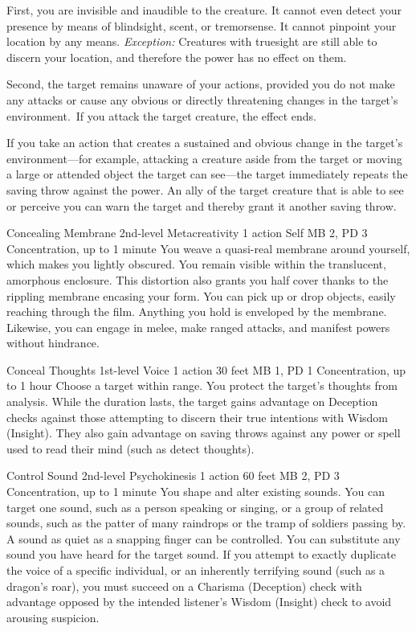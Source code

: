 First, you are invisible and inaudible to the creature.
It cannot even detect your presence by means of blindsight,
scent, or tremorsense.
It cannot pinpoint your location by any means.
\textit{Exception:} Creatures with truesight are still
able to discern your location,
and therefore the power has no effect on them.
  
Second, the target remains unaware of your actions,
provided you do not make any attacks or cause any obvious
or directly threatening changes in the target's environment.\
If you attack the target creature, the effect ends.
  
If you take an action that creates a sustained and obvious change
in the target's environment---for example, attacking a creature
aside from the target or moving a large or attended object
the target can see---the target immediately repeats the
saving throw against the power.
An ally of the target creature that is able to see or perceive you
can warn the target and thereby grant it another saving throw.

\DndPowerHeader%
  {Concealing Membrane}
  {2nd-level Metacreativity}
  {1 action}
  {Self}
  {MB 2, PD 3}
  {Concentration, up to 1 minute}
  You weave a quasi-real membrane around yourself,
  which makes you lightly obscured.
  You remain visible within the translucent, amorphous enclosure.
  This distortion also grants you half cover
  thanks to the rippling membrane encasing your form.
  You can pick up or drop objects, easily reaching through the film.
  Anything you hold is enveloped by the membrane.
  Likewise, you can engage in melee, make ranged attacks,
  and manifest powers without hindrance.

\DndPowerHeader%
  {Conceal Thoughts}
  {1st-level Voice}
  {1 action}
  {30 feet}
  {MB 1, PD 1}
  {Concentration, up to 1 hour}
Choose a target within range.
You protect the target's thoughts from analysis.
While the duration lasts, the target gains advantage on
Deception checks against those attempting to discern their
true intentions with Wisdom (Insight).
They also gain advantage on saving throws against any power or spell
used to read their mind (such as detect thoughts).

\DndPowerHeader%
  {Control Sound}
  {2nd-level Psychokinesis}
  {1 action}
  {60 feet}
  {MB 2, PD 3}
  {Concentration, up to 1 minute}
  You shape and alter existing sounds.
  You can target one sound, such as a person speaking or singing,
  or a group of related sounds,
  such as the patter of many raindrops or the tramp of soldiers passing by.
  A sound as quiet as a snapping finger can be controlled.
  You can substitute any sound you have heard for the target sound.
  If you attempt to exactly duplicate the voice of a specific individual,
  or an inherently terrifying sound (such as a dragon's roar),
  you must succeed on a Charisma (Deception) check with advantage
  opposed by the intended listener's Wisdom (Insight) check
  to avoid arousing suspicion.

